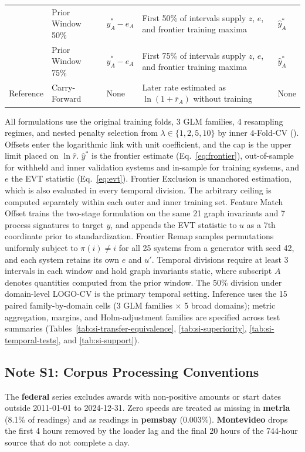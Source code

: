 \documentclass{article}
\begin{document}
\begin{table}[H]
\begin{tabularx}{\linewidth}{@{}lll>{\raggedright\arraybackslash}Xl@{}}
 & Prior Window 50\% & $\widehat{y}_A^{*} - e_A$ & First 50\% of intervals supply $z$, $e$, and frontier training maxima & $\widehat{y}_A^{*}$ \\
 & Prior Window 75\% & $\widehat{y}_A^{*} - e_A$ & First 75\% of intervals supply $z$, $e$, and frontier training maxima & $\widehat{y}_A^{*}$ \\
\addlinespace
Reference & Carry-Forward & None & Later rate estimated as $\ln(1 + \bar{r}_A)$ without training & None \\
\bottomrule
\end{tabularx}
\par\vspace{12pt}
\begin{minipage}{\linewidth}
\footnotesize
All formulations use the original training folds, 3 GLM families, 4 resampling regimes, and nested penalty selection from $\lambda \in \{1, 2, 5, 10\}$ by inner $4$-Fold-CV (). Offsets enter the logarithmic link with unit coefficient, and the cap is the upper limit placed on $\ln \widehat{r}$. $\widehat{y}^{*}$ is the frontier estimate (Eq.~\eqref{eq:frontier}), out-of-sample for withheld and inner validation systems and in-sample for training systems, and $e$ the EVT statistic (Eq.~\eqref{eq:evt}). Frontier Exclusion is unanchored estimation, which is also evaluated in every temporal division. The arbitrary ceiling is computed separately within each outer and inner training set. Feature Match Offset trains the two-stage formulation on the same 21 graph invariants and 7 process signatures to target $y$, and appends the EVT statistic to $u$ as a 7th coordinate prior to standardization. Frontier Remap samples permutations uniformly subject to $\pi(i) \ne i$ for all 25 systems from a generator with seed 42, and each system retains its own $e$ and $u'$. Temporal divisions require at least 3 intervals in each window and hold graph invariants static, where subscript $A$ denotes quantities computed from the prior window. The 50\% division under domain-level LOGO-CV is the primary temporal setting. Inference uses the 15 paired family-by-domain cells (3 GLM families $\times$ 5 broad domains); metric aggregation, margins, and Holm-adjustment families are specified across test summaries (Tables~\ref{tab:si-transfer-equivalence}, \ref{tab:si-superiority}, \ref{tab:si-temporal-tests}, and \ref{tab:si-support}).
\end{minipage}
\end{table}

\clearpage
\subsection*{Note S1: Corpus Processing Conventions}
\label{sec:si-note-processing}
The \textbf{federal} series excludes awards with non-positive amounts or start dates outside 2011-01-01 to 2024-12-31. Zero speeds are treated as missing in \textbf{metrla} (8.1\% of readings) and as readings in \textbf{pemsbay} (0.003\%). \textbf{Montevideo} drops the first 4 hours removed by the loader lag and the final 20 hours of the 744-hour source that do not complete a day.
\end{document}
